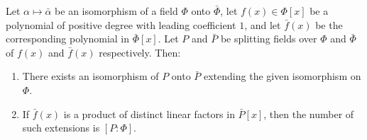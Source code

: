 Let $\alpha \mapsto \bar{\alpha}$ be an isomorphism of a field $\Phi$ onto $\bar{\Phi}$, let $f(x) \in \Phi[x]$ be a polynomial of positive degree with leading coefficient $1$, and let $\bar{f}(x)$ be the corresponding polynomial in $\bar{\Phi}[x]$. Let $P$ and $\bar{P}$ be splitting fields over $\Phi$ and $\bar{\Phi}$ of $f(x)$ and $\bar{f}(x)$ respectively. Then:
\begin{enumerate}
\item There exists an isomorphism of $P$ onto $\bar{P}$ extending the given isomorphism on $\Phi$.
\item If $\bar{f}(x)$ is a product of distinct linear factors in $\bar{P}[x]$, then the number of such extensions is $[P:\Phi]$.
\end{enumerate}

